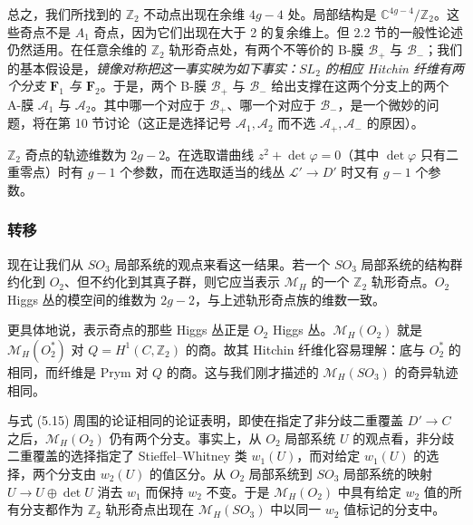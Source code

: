 总之，我们所找到的 $\mathbb{Z}_2$ 不动点出现在余维 $4g-4$ 处。局部结构是 $\mathbb{C}^{4g-4}/\mathbb{Z}_2$。这些奇点不是 $A_1$ 奇点，因为它们出现在大于 2 的复余维上。但 2.2 节的一般性论述仍然适用。在任意余维的 $\mathbb{Z}_2$ 轨形奇点处，有两个不等价的 B-膜 $\mathcal{B}_+$ 与 $\mathcal{B}_-$；我们的基本假设是，\emph{镜像对称把这一事实映为如下事实：$SL_2$ 的相应 Hitchin 纤维有两个分支 $\boldsymbol{F}_1$ 与 $\boldsymbol{F}_2$}。于是，两个 B-膜 $\mathcal{B}_+$ 与 $\mathcal{B}_-$ 给出支撑在这两个分支上的两个 A-膜 $\mathcal{A}_1$ 与 $\mathcal{A}_2$。其中哪一个对应于 $\mathcal{B}_+$、哪一个对应于 $\mathcal{B}_-$，是一个微妙的问题，将在第 10 节讨论（这正是选择记号 $\mathcal{A}_1,\mathcal{A}_2$ 而不选 $\mathcal{A}_+,\mathcal{A}_-$ 的原因）。

$\mathbb{Z}_2$ 奇点的轨迹维数为 $2g-2$。在选取谱曲线 $z^2+\det\varphi = 0$（其中 $\det\varphi$ 只有二重零点）时有 $g-1$ 个参数，而在选取适当的线丛 $\mathcal{L}'\to D'$ 时又有 $g-1$ 个参数。


\subsubsection{转移}

现在让我们从 $SO_3$ 局部系统的观点来看这一结果。若一个 $SO_3$ 局部系统的结构群约化到 $O_2$、但不约化到其真子群，则它应当表示 $\mathcal{M}_H$ 的一个 $\mathbb{Z}_2$ 轨形奇点。$O_2$ Higgs 丛的模空间的维数为 $2g-2$，与上述轨形奇点族的维数一致。

更具体地说，表示奇点的那些 Higgs 丛正是 $O_2$ Higgs 丛。$\mathcal{M}_H(O_2)$ 就是 $\mathcal{M}_H(O_2^*)$ 对 $Q = H^1(C,\mathbb{Z}_2)$ 的商。故其 Hitchin 纤维化容易理解：底与 $O_2^*$ 的相同，而纤维是 Prym 对 $Q$ 的商。这与我们刚才描述的 $\mathcal{M}_H(SO_3)$ 的奇异轨迹相同。

与式 (5.15) 周围的论证相同的论证表明，即使在指定了非分歧二重覆盖 $D'\to C$ 之后，$\mathcal{M}_H(O_2)$ 仍有两个分支。事实上，从 $O_2$ 局部系统 $U$ 的观点看，非分歧二重覆盖的选择指定了 Stieffel--Whitney 类 $w_1(U)$，而对给定 $w_1(U)$ 的选择，两个分支由 $w_2(U)$ 的值区分。从 $O_2$ 局部系统到 $SO_3$ 局部系统的映射 $U\to U\oplus\det U$ 消去 $w_1$ 而保持 $w_2$ 不变。于是 $\mathcal{M}_H(O_2)$ 中具有给定 $w_2$ 值的所有分支都作为 $\mathbb{Z}_2$ 轨形奇点出现在 $\mathcal{M}_H(SO_3)$ 中以同一 $w_2$ 值标记的分支中。

